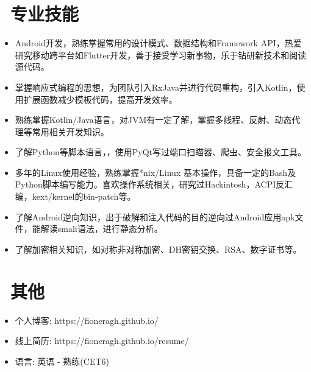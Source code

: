 \documentclass{resume}
\begin{document}
\section{\faCogs\ 专业技能}
\begin{itemize}[parsep=0.5ex]
  \item Android开发，熟练掌握常用的设计模式、数据结构和Framework API，热爱研究移动跨平台如Flutter开发，善于接受学习新事物，乐于钻研新技术和阅读源代码。
  \item 掌握响应式编程的思想，为团队引入RxJava并进行代码重构，引入Kotlin，使用扩展函数减少模板代码，提高开发效率。
  \item 熟练掌握Kotlin/Java语言，对JVM有一定了解，掌握多线程、反射、动态代理等常用相关开发知识。
  \item 了解Python等脚本语言，，使用PyQt写过端口扫瞄器、爬虫、安全报文工具。
  \item 多年的Linux使用经验，熟练掌握*nix/Linux 基本操作，具备一定的Bash及Python脚本编写能力。喜欢操作系统相关，研究过Hackintosh，ACPI反汇编，kext/kernel的bin-patch等。
  \item 了解Android逆向知识，出于破解和注入代码的目的逆向过Android应用apk文件，能解读smali语法，进行静态分析。
  \item 了解加密相关知识，如对称非对称加密、DH密钥交换、RSA、数字证书等。
\end{itemize}


\section{\faInfo\ 其他}
\begin{itemize}[parsep=0.5ex]
  \item 个人博客: https://fioneragh.github.io/
  \item 线上简历: https://fioneragh.github.io/resume/
  \item 语言: 英语 - 熟练(CET6)
\end{itemize}

%
%
\end{document}
